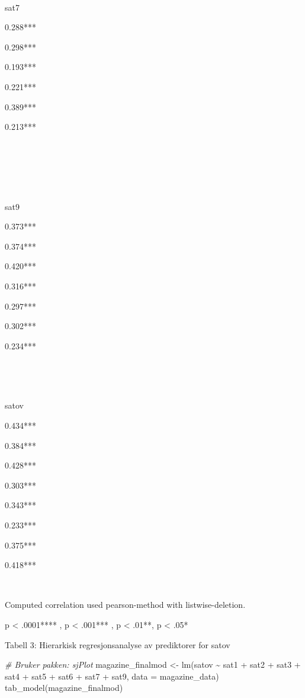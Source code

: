 \documentclass[
]{article}
\newenvironment{Shaded}{\begin{snugshade}}{\end{snugshade}}
\newcommand{\AttributeTok}[1]{\textcolor[rgb]{0.77,0.63,0.00}{#1}}
\newcommand{\CommentTok}[1]{\textcolor[rgb]{0.56,0.35,0.01}{\textit{#1}}}
\newcommand{\FunctionTok}[1]{\textcolor[rgb]{0.00,0.00,0.00}{#1}}
\newcommand{\NormalTok}[1]{#1}
\newcommand{\OtherTok}[1]{\textcolor[rgb]{0.56,0.35,0.01}{#1}}
\newcommand{\SpecialCharTok}[1]{\textcolor[rgb]{0.00,0.00,0.00}{#1}}
\begin{document}
~

sat7

0.288***

0.298***

0.193***

0.221***

0.389***

0.213***

~

~

~

sat9

0.373***

0.374***

0.420***

0.316***

0.297***

0.302***

0.234***

~

~

satov

0.434***

0.384***

0.428***

0.303***

0.343***

0.233***

0.375***

0.418***

~

Computed correlation used pearson-method with listwise-deletion.

p \textless{} .0001**** , p \textless{} .001*** , p \textless{} .01**, p \textless{} .05*

Tabell 3: Hierarkisk regresjonsanalyse av prediktorer for satov

\begin{Shaded}
\begin{Highlighting}[]
\CommentTok{\# Bruker pakken: sjPlot}
\NormalTok{magazine\_finalmod }\OtherTok{\textless{}{-}} \FunctionTok{lm}\NormalTok{(satov }\SpecialCharTok{\textasciitilde{}}\NormalTok{ sat1 }\SpecialCharTok{+}\NormalTok{ sat2 }\SpecialCharTok{+}\NormalTok{ sat3 }\SpecialCharTok{+}\NormalTok{ sat4 }\SpecialCharTok{+}\NormalTok{ sat5 }\SpecialCharTok{+}\NormalTok{ sat6 }\SpecialCharTok{+}\NormalTok{ sat7 }\SpecialCharTok{+}\NormalTok{ sat9, }\AttributeTok{data =}\NormalTok{ magazine\_data)}
\FunctionTok{tab\_model}\NormalTok{(magazine\_finalmod)}
\end{Highlighting}
\end{Shaded}
\end{document}
